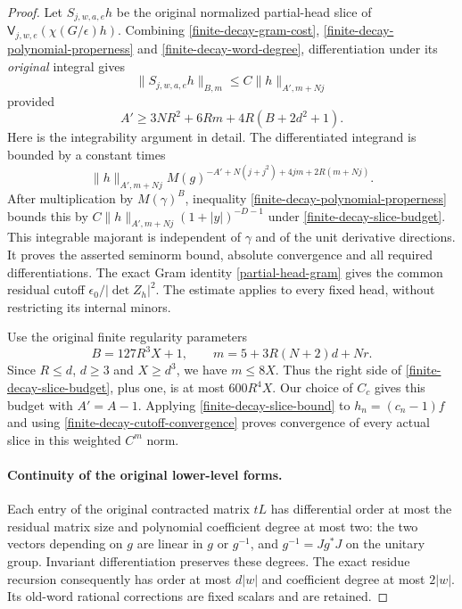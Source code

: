 \begin{proof}
Let $S_{j,w,a,e}h$ be the original normalized partial-head slice
of $\mathsf V_{j,w,e}(\chi(G/\epsilon)h)$.  Combining
\eqref{finite-decay-gram-cost},
\eqref{finite-decay-polynomial-properness} and
\eqref{finite-decay-word-degree}, differentiation under its
\emph{original} integral gives
\begin{equation}\label{finite-decay-slice-bound}
 \|S_{j,w,a,e}h\|_{B,m}\le C\|h\|_{A',m+Nj}
\end{equation}
provided
\begin{equation}\label{finite-decay-slice-budget}
 A'\ge 3NR^2+6Rm+4R(B+2d^2+1).
\end{equation}
Here is the integrability argument in detail.  The differentiated
integrand is bounded by a constant times
\[
 \|h\|_{A',m+Nj}
       M(g)^{-A'+N(j+j^2)+4jm+2R(m+Nj)}.
\]
After multiplication by $M(\gamma)^B$, inequality
\eqref{finite-decay-polynomial-properness} bounds this by
$C\|h\|_{A',m+Nj}(1+|y|)^{-D-1}$ under
\eqref{finite-decay-slice-budget}.  This integrable majorant is
independent of $\gamma$ and of the unit derivative directions.
It proves the asserted seminorm bound, absolute convergence and
all required differentiations.  The exact Gram identity
\eqref{partial-head-gram} gives the common residual cutoff
$\epsilon_0/|\det Z_h|^2$.  The estimate applies to every fixed
head, without restricting its internal minors.

Use the original finite regularity parameters
\[
 B=127R^3X+1,\qquad m=5+3R(N+2)d+Nr.
\]
Since $R\le d$, $d\ge3$ and $X\ge d^3$, we have $m\le8X$.
Thus the right side of \eqref{finite-decay-slice-budget}, plus
one, is at most $600R^4X$.  Our choice of $C_c$ gives this budget
with $A'=A-1$.  Applying \eqref{finite-decay-slice-bound} to
$h_n=(c_n-1)f$ and using
\eqref{finite-decay-cutoff-convergence} proves convergence of
every actual slice in this weighted $C^m$ norm.

\paragraph{Continuity of the original lower-level forms.}
Each entry of the original contracted matrix $tL$ has differential
order at most the residual matrix size and polynomial coefficient
degree at most two: the two vectors depending on $g$ are linear
in $g$ or $g^{-1}$, and $g^{-1}=Jg^*J$ on the unitary group.
Invariant differentiation preserves these degrees.  The exact
residue recursion consequently has order at most $d|w|$ and
coefficient degree at most $2|w|$.  Its old-word rational
corrections are fixed scalars and are retained.


\end{proof}
